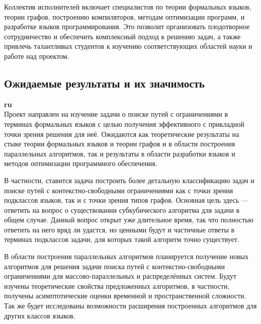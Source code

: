 \documentclass[12pt]{article}  %
\theoremstyle{remark}
\begin{document}
Коллектив исполнителей включает специалистов по теории формальных языков, теории графов, построению компиляторов, методам оптимизации программ, и разработке языков программирования.
Это позволит организовать плодотворное сотрудничество и обеспечить комплексный подход к решению задач, а также привлечь талантливых студентов к изучению соответствующих областей науки и работе над проектом.


\subsection{Ожидаемые результаты и их значимость}

\textbf{ru}\\
%
Проект направлен на изучение задачи о поиске путей с ограничениями в терминах формальных языков с целью получения эффективного с прикладной точки зрения решения для неё.
Ожидаются как теоретические результаты на стыке теории формальных языков и теории графов и в области построения параллельных алгоритмов, так и результаты в области разработки языков и методов оптимизации программного обеспечения.

В частности, ставится задача построить более детальную классификацию задач и поиске путей с контекстно-свободными ограничениями как с точки зрения подклассов языков, так и с точки зрения типов графов.
Основная цель здесь --- ответить на вопрос о существовании субкубического алгоритма для задачи в общем случае.
Данный вопрос открыт уже длительное время, так что полностью ответить на него вряд ли удастся, но ценными будут и частичные ответы в терминах подклассов задачи, для которых такой алгоритм точно существует.

В области построения параллельных алгоритмов планируется получение новых алгоритмов для решения задачи поиска путей с контекстно-свободными ограничениями для массово-параллельных и распределённых систем.
Будут изучены теоретические свойства предложенных алгоритмов, в частности, получены асимптотические оценки временной и пространственной сложности.
Так же будет исследованы возможности расширения построенных алгоритмов для других классов языков.
\end{document}
